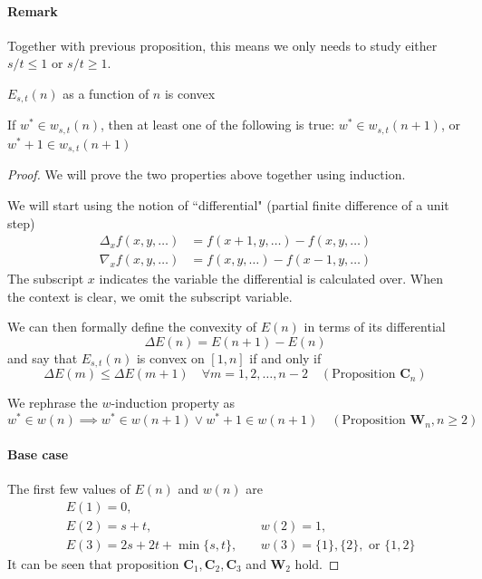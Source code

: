 \documentclass[]{article}
\begin{document}
\paragraph{Remark}
 Together with previous proposition, this means we only needs to study either $s/t \le1$ or $s/t \ge 1$.

\vspace{1cm}
\begin{lemma}[$n$-convexity]
$E_{s,t}(n)$ as a function of $n$ is convex
\end{lemma}
\begin{lemma}[$w$-induction]
	If $w^*\in w_{s,t}(n)$, then at least one of the following is true: $w^*\in w_{s,t}(n+1)$, or $w^*+1\in w_{s,t}(n+1)$
\end{lemma}
\begin{proof}
We will prove the two properties above together using induction.

We will start using the notion of ``differential" (partial finite difference of a unit step)
\begin{align*}
\Delta_x f(x,y,\dots) &= f(x + 1,y,\dots) - f(x,y,\dots)\\
\nabla_x f(x,y,\dots) &= f(x ,y,\dots) - f(x - 1,y,\dots)
\end{align*}
The subscript $x$ indicates the variable the differential is calculated over. When the context is clear, we omit the subscript variable.

We can then formally define the convexity of $E(n)$ in terms of its differential
\[
\Delta E(n) = E(n+1) - E(n)
\]
and say that $E_{s,t}(n)$ is convex on $[1,n]$ if and only if
\[
 \Delta E(m)\le \Delta E(m+1)\quad\forall m = 1,2,\dots,n-2\quad (\text{Proposition } \mathbf{C}_n)
\]

We rephrase the $w$-induction property as
\[
w^*\in w(n) \implies w^* \in w(n+1) \lor w^*+1 \in w(n+1) \quad (\text{Proposition } \mathbf{W}_n, n\geq 2)
\]


\paragraph{Base case}
The first few values of $E(n)$ and $w(n)$ are
\begin{align*}
&E(1) = 0,\ &&\\
&E(2) = s + t, \ &&w(2) = 1,\\
&E(3) = 2s + 2t + \min\{s, t\}, \ &&w(3) = \{1\}, \{2\},\text{ or }\{1,2\}
\end{align*}
It can be seen that proposition $\mathbf{C}_1, \mathbf{C}_2, \mathbf{C}_3$ and $\mathbf{W}_2$ hold.


\end{proof}
\end{document}
